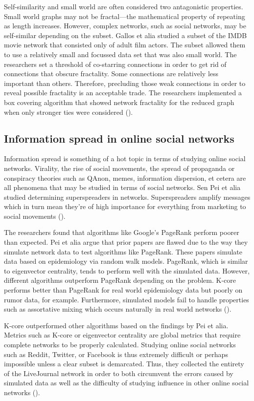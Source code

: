 \documentclass[12pt, a4paper]{article}
\begin{document}
Self-similarity and small world are often considered two antagonistic properties. Small world graphs may not be fractal---the mathematical property of repeating as length increases. However, complex networks, such as social networks, may be self-similar depending on the subset. Gallos et alia studied a subset of the IMDB movie network that consisted only of adult film actors. The subset allowed them to use a relatively small and focussed data set that was also small world. The researchers set a threshold of co-starring connections in order to get rid of connections that obscure fractality. Some connections are relatively less important than others. Therefore, precluding those weak connections in order to reveal possible fractality is an acceptable trade. The researchers implemented a box covering algorithm that showed network fractality for the reduced graph when only stronger ties were considered (\cite{galloscuny2013}).

\subsection{Information spread in online social networks}
Information spread is something of a hot topic in terms of studying online social networks. Virality, the rise of social movements, the spread of propaganda or conspiracy theories such as QAnon, memes, information dispersion, et cetera are all phenomena that may be studied in terms of social networks. Sen Pei et alia studied determining superspreaders in networks. Superspreaders amplify messages which in turn mean they're of high importance for everything from marketing to social movements (\cite{peispread2014}).

The researchers found that algorithms like Google's PageRank perform poorer than expected. Pei et alia argue that prior papers are flawed due to the way they simulate network data to test algorithms like PageRank. These papers simulate data based on epidemiology via random walk models. PageRank, which is similar to eigenvector centrality, tends to perform well with the simulated data. However, different algorithms outperform PageRank depending on the problem. K-core performs better than PageRank for real world epidemiology data but poorly on rumor data, for example. Furthermore, simulated models fail to handle properties such as assortative mixing which occurs naturally in real world networks (\cite{peispread2014}).

K-core outperformed other algorithms based on the findings by Pei et alia. Metrics such as K-core or eigenvector centrality are global metrics that require complete networks to be properly calculated. Studying online social networks such as Reddit, Twitter, or Facebook is thus extremely difficult or perhaps impossible unless a clear subset is demarcated. Thus, they collected the entirety of the LiveJournal network in order to both circumvent the errors caused by simulated data as well as the difficulty of studying influence in other online social networks (\cite{peispread2014}).
\end{document}
